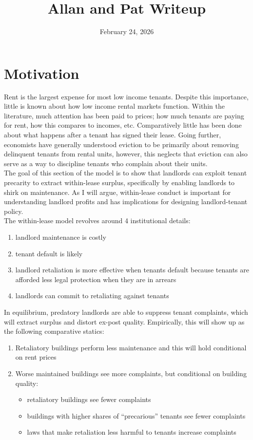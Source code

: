 \documentclass[11pt]{article}
\title{Allan and Pat Writeup}
\author{}
\date{February 24, 2026}
\begin{document}
\maketitle

\section{Motivation}

Rent is the largest expense for most low income tenants. Despite this importance, little is known about how low income rental markets function. Within the literature, much attention has been paid to prices; how much tenants are paying for rent, how this compares to incomes, etc. Comparatively little has been done about what happens after a tenant has signed their lease. Going further, economists have generally understood eviction to be primarily about removing delinquent tenants from rental units, however, this neglects that eviction can also serve as a way to discipline tenants who complain about their units.\\

The goal of this section of the model is to show that landlords can exploit tenant precarity to extract within-lease surplus, specifically by enabling landlords to shirk on maintenance. As I will argue, within-lease conduct is important for understanding landlord profits and has implications for designing landlord-tenant policy. \\

The within-lease model revolves around 4 institutional details:

\begin{enumerate}
  \item landlord maintenance is costly
  \item tenant default is likely
  \item landlord retaliation is more effective when tenants default because tenants are afforded less legal protection when they are in arrears
  \item landlords can commit to retaliating against tenants
\end{enumerate}

In equilibrium, predatory landlords are able to suppress tenant complaints, which will extract surplus and distort ex-post quality. Empirically, this will show up as the following comparative statics:

\begin{enumerate}
  \item Retaliatory buildings perform less maintenance and this will hold conditional on rent prices
  \item Worse maintained buildings see more complaints, but conditional on building quality:
      \begin{itemize}
        \item retaliatory buildings see fewer complaints
        \item buildings with higher shares of ``precarious'' tenants see fewer complaints
        \item laws that make retaliation less harmful to tenants increase complaints
      \end{itemize}
\end{enumerate}
\end{document}
